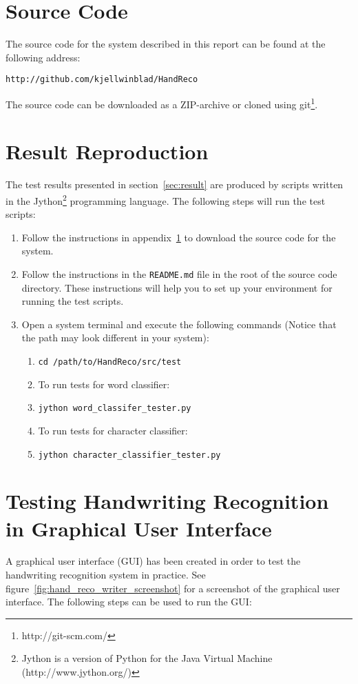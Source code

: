 
\section{Source Code}\label{app:source_code}

The source code for the system described in this report can be found at the following address:

\begin{verbatim}
http://github.com/kjellwinblad/HandReco
\end{verbatim}

The source code can be downloaded as a ZIP-archive or cloned using git\footnote{http://git-scm.com/}.

\section{Result Reproduction}\label{app:result_reproduction} 

The test results presented in section~\ref{sec:result} are produced by scripts written in the Jython\footnote{Jython is a version of Python for the Java Virtual Machine (http://www.jython.org/)} programming language. The following steps will run the test scripts:

\begin{enumerate}
 \item Follow the instructions in appendix~\ref{app:source_code} to download the source code for the system.
 \item Follow the instructions in the \verb|README.md| file in the root of the source code directory. These instructions will help you to set up your environment for running the test scripts.
 \item Open a system terminal and execute the following commands (Notice that the path may look different in your system):
 \begin{enumerate}
  \item \verb|cd /path/to/HandReco/src/test|
  \item To run tests for word classifier:
  \item \verb|jython word_classifer_tester.py|
  \item To run tests for character classifier:
  \item \verb|jython character_classifier_tester.py|
 \end{enumerate}
\end{enumerate}

\section{Testing Handwriting Recognition in Graphical User Interface}
A graphical user interface (GUI) has been created in order to test the handwriting recognition system in practice. See figure~\ref{fig:hand_reco_writer_screenshot} for a screenshot of the graphical user interface. The following steps can be used to run the GUI:

